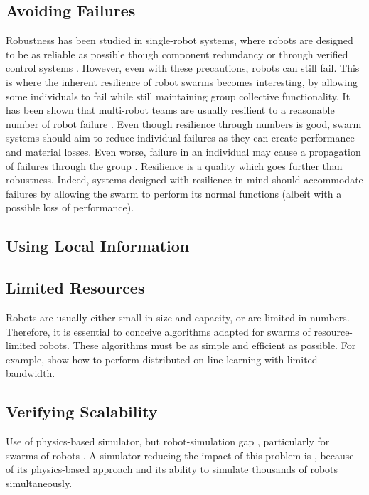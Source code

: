 \subsection{Avoiding Failures}
Robustness has been studied in single-robot systems, where robots are designed to be as reliable as possible though component redundancy \cite{brooks1986robust} or through verified control systems \cite{lim1987robust,slotine1985robust,slotine1991applied}. However, even with these precautions, robots can still fail. This is where the inherent resilience of robot swarms becomes interesting, by allowing some individuals to fail while still maintaining group collective functionality. It has been shown that multi-robot teams are usually resilient to a reasonable number of robot failure \cite{ramachandran2019resilience,wehbe2021probabilistic,winfield2006safety}. Even though resilience through numbers is good, swarm systems should aim to reduce individual failures as they can create performance and material losses. Even worse, failure in an individual may cause a propagation of failures through the group \cite{prorok2021beyond}. Resilience is a quality which goes further than robustness. Indeed, systems designed with resilience in mind should accommodate failures by allowing the swarm to perform its normal functions (albeit with a possible loss of performance).

\subsection{Using Local Information}

\subsection{Limited Resources}
Robots are usually either small in size and capacity, or are limited in numbers. Therefore, it is essential to conceive algorithms adapted for swarms of resource-limited robots. These algorithms must be as simple and efficient as possible. For example, \cite{fontbonne2020distributed} show how to perform distributed on-line learning with limited bandwidth.

\subsection{Verifying Scalability}
Use of physics-based simulator, but robot-simulation gap \cite{jakobi1995noise}, particularly for swarms of robots \cite{francesca2016automatic}. A simulator reducing the impact of this problem is \cite{Pinciroli:SI2012}, because of its physics-based approach and its ability to simulate thousands of robots simultaneously.

